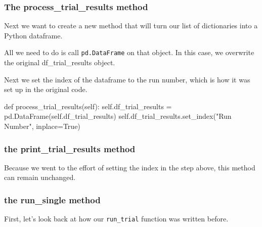 \documentclass[
  letterpaper,
  DIV=11,
  numbers=noendperiod]{scrreprt}
\newenvironment{Shaded}{}{}
\newcommand{\KeywordTok}[1]{\textcolor[rgb]{0.84,0.23,0.29}{#1}}
\newcommand{\NormalTok}[1]{\textcolor[rgb]{0.14,0.16,0.18}{#1}}
\newcommand{\OperatorTok}[1]{\textcolor[rgb]{0.14,0.16,0.18}{#1}}
\newcommand{\StringTok}[1]{\textcolor[rgb]{0.01,0.18,0.38}{#1}}
\newcommand{\VariableTok}[1]{\textcolor[rgb]{0.89,0.38,0.04}{#1}}
\begin{document}
\subsubsection{The process\_trial\_results
method}\label{the-process_trial_results-method}

Next we want to create a new method that will turn our list of
dictionaries into a Python dataframe.

All we need to do is call \texttt{pd.DataFrame} on that object. In this
case, we overwrite the original df\_trial\_results object.

Next we set the index of the dataframe to the run number, which is how
it was set up in the original code.

\begin{Shaded}
\begin{Highlighting}[]
\KeywordTok{def}\NormalTok{ process\_trial\_results(}\VariableTok{self}\NormalTok{):}
  \VariableTok{self}\NormalTok{.df\_trial\_results }\OperatorTok{=}\NormalTok{ pd.DataFrame(}\VariableTok{self}\NormalTok{.df\_trial\_results)}
  \VariableTok{self}\NormalTok{.df\_trial\_results.set\_index(}\StringTok{"Run Number"}\NormalTok{, inplace}\OperatorTok{=}\VariableTok{True}\NormalTok{)}
\end{Highlighting}
\end{Shaded}

\subsubsection{the print\_trial\_results
method}\label{the-print_trial_results-method-2}

Because we went to the effort of setting the index in the step above,
this method can remain unchanged.

\subsubsection{the run\_single method}\label{the-run_single-method}

First, let's look back at how our \texttt{run\_trial} function was
written before.
\end{document}
